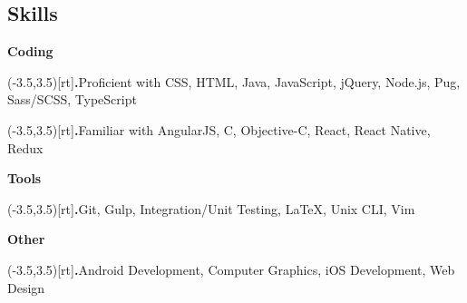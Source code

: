 \documentclass[9pt]{extarticle}
\newcommand{\BulletMark}{{\color{bulletMark}\bfseries.}}
\newcommand{\SideBox}[1]{\makebox(-3.5,3.5)[rt]{#1}}
\newcommand{\Bullet}[1]{\item\SideBox{\BulletMark}{\color{bullet}#1}}
\newcommand{\Bullets}[1]{\begin{trivlist}#1\end{trivlist}}
\newcommand{\Subtitle}[1]{{\color{subtitle}\normalsize\bfseries#1}}
\newcommand{\Subsection}[2]{\Subtitle{#1}\Bullets{#2}}
\begin{document}
\begin{paracol}{2}
\begin{rightcolumn}
        \section{Skills}
            \Subsection{Coding}{
                \Bullet{Proficient with CSS, HTML, Java, JavaScript, jQuery, Node.js, Pug, Sass/SCSS, TypeScript}
                \Bullet{Familiar with AngularJS, C, Objective-C, React, React Native, Redux}
            }
            \vfill
            \Subsection{Tools}{
                \Bullet{Git, Gulp, Integration/Unit Testing, LaTeX, Unix CLI, Vim}
            }
            \vfill
            \Subsection{Other}{
                \Bullet{Android Development, Computer Graphics, iOS Development,  Web Design}
            }
        \pagebreak
    \end{rightcolumn}
\end{paracol}
\end{document}
